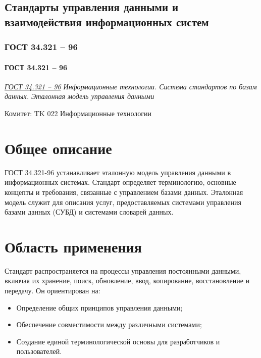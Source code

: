 
\subsection{Стандарты управления данными и взаимодействия информационных систем}
\subsubsection{ГОСТ 34.321 -- 96}
\paragraph{ГОСТ 34.321 -- 96}
\emph{\href{https://internet-law.ru/gosts/gost/6808/}{ГОСТ 34.321 -- 96}
Информационные технологии.
Система стандартов по базам данных.
Эталонная модель управления данными
}
\par
Комитет: TK 022 Информационные технологии
\section*{Общее описание}
ГОСТ 34.321-96 устанавливает эталонную модель управления данными в информационных системах.
Стандарт определяет терминологию, основные концепты и требования, связанные с управлением базами данных.
Эталонная модель служит для описания услуг, предоставляемых системами управления базами данных (СУБД) и системами словарей данных.

\section*{Область применения}
Стандарт распространяется на процессы управления постоянными данными, включая их хранение, поиск, обновление, ввод, копирование, восстановление и передачу. Он ориентирован на:
\begin{itemize}
    \item Определение общих принципов управления данными;
    \item Обеспечение совместимости между различными системами;
    \item Создание единой терминологической основы для разработчиков и пользователей.
\end{itemize}

